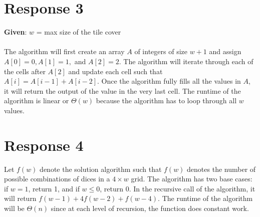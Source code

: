 \documentclass[12pt, a4paper]{article}
\begin{document}
\newpage
\section*{\centering Response 3}

\textbf{Given}: \(w\) = max size of the tile cover
\\
\\
The algorithm will first create an array \(A\) of integers of size \(w + 1\) and assign \(A[0] = 0, A[1] = 1,\) and \(A[2] = 2\).
The algorithm will iterate through each of the cells after \(A[2]\) and update each cell such that \(A[i] = A[i - 1] + A[i - 2]\).
Once the algorithm fully fills all the values in \(A\), it will return the output of the value in the very last cell.
The runtime of the algorithm is linear or \(\Theta(w)\) because the algorithm has to loop through all \(w\) values.   

\newpage
\section*{\centering Response 4}
Let \(f(w)\) denote the solution algorithm such that \(f(w)\) denotes the number of possible combinations of dices in a \(4 \times w\) grid.
The algorithm has two base cases: if \(w = 1\), return 1, and if \(w \leq 0\), return 0.
In the recursive call of the algorithm, it will return \(f(w - 1) + 4f(w - 2) + f(w - 4)\). 
The runtime of the algorithm will be \(\Theta(n)\) since at each level of recursion, the function does constant work.
\end{document}
